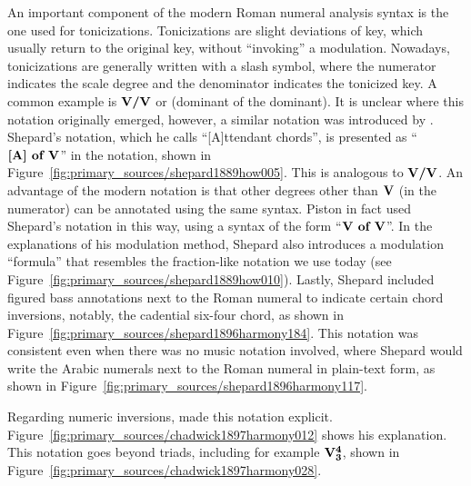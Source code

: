 An important component of the modern Roman numeral analysis syntax is the one used for tonicizations.
Tonicizations are slight deviations of key, which usually return to the original key, without ``invoking'' a modulation.
Nowadays, tonicizations are generally written with a slash symbol, where the numerator indicates the scale degree and the denominator indicates the tonicized key.
A common example is $\textbf{V/V}\relax\relax$ or (dominant of the dominant).
It is unclear where this notation originally emerged, however, a similar notation was introduced by \textcite{shepard1889how}.
Shepard's notation, which he calls ``[A]ttendant chords'', is presented as ``$\textbf{[A] of V}\relax\relax$'' in the notation, shown in Figure~\ref{fig:primary_sources/shepard1889how005}.
This is analogous to $\textbf{V/V}\relax\relax$.
An advantage of the modern notation is that other degrees other than $\textbf{V}\relax\relax$ (in the numerator) can be annotated using the same syntax.
Piston in fact used Shepard's notation in this way, using a syntax of the form ``$\textbf{V of V}\relax\relax$''.
In the explanations of his modulation method, Shepard also introduces a modulation ``formula'' that resembles the fraction-like notation we use today (see Figure~\ref{fig:primary_sources/shepard1889how010}).
Lastly, Shepard included figured bass annotations next to the Roman numeral to indicate certain chord inversions, notably, the cadential six-four chord, as shown in Figure~\ref{fig:primary_sources/shepard1896harmony184}.
This notation was consistent even when there was no music notation involved, where Shepard would write the Arabic numerals next to the Roman numeral in plain-text form, as shown in Figure~\ref{fig:primary_sources/shepard1896harmony117}.





Regarding numeric inversions, \textcite{chadwick1897harmony} made this notation explicit.
Figure~\ref{fig:primary_sources/chadwick1897harmony012} shows his explanation.
This notation goes beyond triads, including for example
$\textbf{V}\relax\relax{\footnotesize {}^\textbf{4}\relax_\textbf{3}\relax\relax}$, shown in Figure~\ref{fig:primary_sources/chadwick1897harmony028}.

